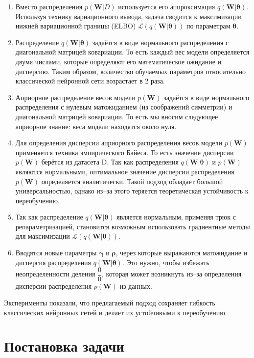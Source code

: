 \documentclass{article}
\begin{document}
\begin{enumerate}
 \item Вместо распределения $p(\pmb{W}| D)$ используется его аппроксимация $q(\pmb{W} | \pmb{\theta})$. Используя технику вариационного вывода, задача сводится к максимизации нижней вариационной границы (ELBO) $\mathcal{L}(q(\pmb{W} | \pmb{\theta}))$ по параметрам $\pmb{\theta}$.
 \item Распределение $q(\pmb{W} | \pmb{\theta})$ задаётся в виде нормального распределения с диагональной матрицей ковариации. То есть каждый вес модели определяется двумя числами, которые определяют его математическое ожидание и дисперсию. Таким образом, количество обучаемых параметров относительно классической нейронной сети возрастает в 2 раза.
 \item Априорное распределение весов модели $p(\pmb{W})$ задаётся в виде нормального распределения с нулевым матожиданием (из соображений симметрии) и диагональной матрицей ковариации. То есть мы вносим следующее априорное знание: веса модели находятся около нуля.
 \item Для определения дисперсии априорного распределения весов модели $p(\pmb{W})$ применяется техника эмпирического Байеса. То есть значение дисперсии $p(\pmb{W})$ берётся из датасета D. Так как распределения $q(\pmb{W} | \pmb{\theta})$ и $p(\pmb{W})$ являются нормальными, оптимальное значение дисперсии распределения $p(\pmb{W})$ определяется аналитически. Такой подход обладает большой универсальностью, однако из--за этого теряется теоретическая устойчивость к переобучению.
 \item Так как распределение $q(\pmb{W} | \pmb{\theta})$ является нормальным, применяя трюк с репараметризацией, становится возможным использовать градиентные методы для максимизации $\mathcal{L}(q(\pmb{W} | \pmb{\theta}))$.
 \item Вводятся новые параметры $\pmb{\gamma}$ и $\pmb{\rho}$, через которые выражаются матожидание и дисперсия распределения $q(\pmb{W} | \pmb{\theta})$. Это нужно, чтобы избежать неопределенности деления $\dfrac{0}{0}$, которая может возникнуть из--за определения дисперсии распределения $p(\pmb{W})$ из данных.
\end{enumerate}

Эксперименты показали, что предлагаемый подход сохраняет гибкость классических нейронных сетей и делает их устойчивыми к переобучению.

\section{Постановка задачи}
\end{document}
